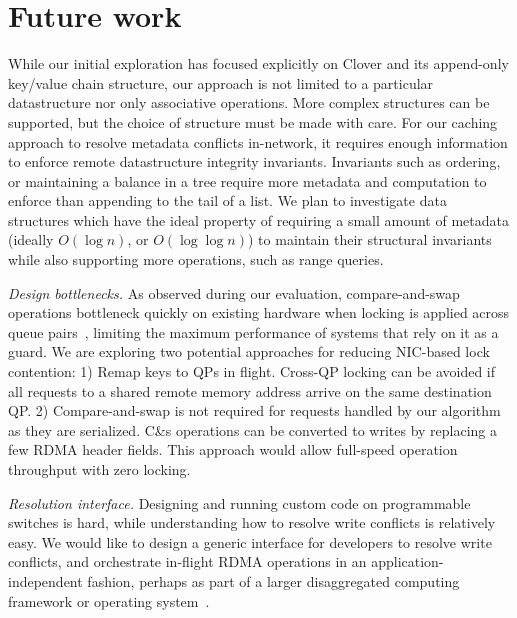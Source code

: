 \section{Future work}

While our initial exploration has focused explicitly on Clover and its
append-only key/value chain structure, our approach is not limited to
a particular datastructure nor only associative operations. More
complex structures can be supported, but the choice of structure must
be made with care.  For our caching approach to resolve metadata
conflicts in-network, it requires enough information to enforce remote
datastructure integrity invariants. Invariants such as ordering, or
maintaining a balance in a tree require more metadata and computation
to enforce than appending to the tail of a list. We plan to
investigate data structures which have the ideal property of requiring
a small amount of metadata (ideally $O(\log n)$, or $O(\log\log n)$) to
maintain their structural invariants while also supporting more
operations, such as range queries.

\emph{Design bottlenecks.} As observed during our evaluation,
compare-and-swap operations bottleneck quickly on existing hardware
when locking is applied across queue pairs~\cite{design-guidelines},
limiting the maximum performance of systems that rely on it as a
guard.  We are exploring two potential approaches for reducing
NIC-based lock contention: 1) Remap keys to QPs in flight. Cross-QP
locking can be avoided if all requests to a shared remote memory
address arrive on the same destination QP. 2) Compare-and-swap is not
required for requests handled by our algorithm as they are
serialized. C\&s operations can be converted to writes by replacing a
few RDMA header fields. This approach would allow full-speed operation
throughput with zero locking.


\emph{Resolution interface.}
Designing and running custom code on programmable switches is hard,
while understanding how to resolve write conflicts is relatively
easy. We would like to design a generic interface for developers to
resolve write conflicts, and orchestrate in-flight RDMA operations in
an application-independent fashion, perhaps as part of a larger
disaggregated computing framework or operating system~\cite{legoos}.
